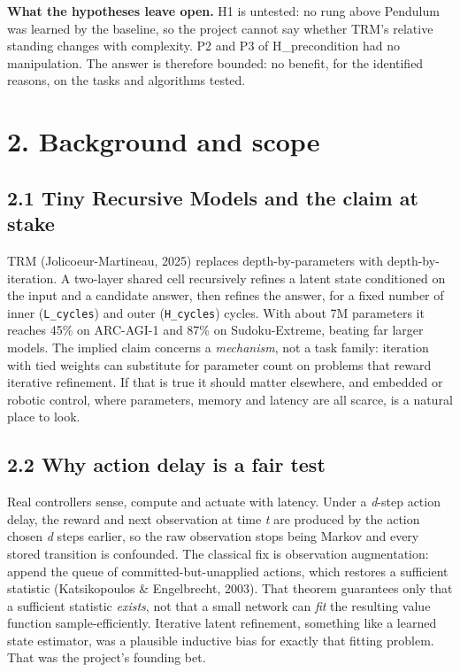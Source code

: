 \documentclass[11pt]{article}
\begin{document}
\textbf{What the hypotheses leave open.} H1 is untested: no rung above Pendulum was learned by the baseline, so the project cannot say whether TRM's relative standing changes with complexity. P2 and P3 of H\_precondition had no manipulation. The answer is therefore bounded: no benefit, for the identified reasons, on the tasks and algorithms tested.





\medskip



\section*{2. Background and scope}



\subsection*{2.1 Tiny Recursive Models and the claim at stake}



TRM (Jolicoeur-Martineau, 2025) replaces depth-by-parameters with depth-by-iteration. A two-layer shared cell recursively refines a latent state conditioned on the input and a candidate answer, then refines the answer, for a fixed number of inner (\texttt{L\_cycles}) and outer (\texttt{H\_cycles}) cycles. With about 7M parameters it reaches 45\% on ARC-AGI-1 and 87\% on Sudoku-Extreme, beating far larger models. The implied claim concerns a \emph{mechanism}, not a task family: iteration with tied weights can substitute for parameter count on problems that reward iterative refinement. If that is true it should matter elsewhere, and embedded or robotic control, where parameters, memory and latency are all scarce, is a natural place to look.



\subsection*{2.2 Why action delay is a fair test}



Real controllers sense, compute and actuate with latency. Under a \emph{d}-step action delay, the reward and next observation at time \emph{t} are produced by the action chosen \emph{d} steps earlier, so the raw observation stops being Markov and every stored transition is confounded. The classical fix is observation augmentation: append the queue of committed-but-unapplied actions, which restores a sufficient statistic (Katsikopoulos \& Engelbrecht, 2003). That theorem guarantees only that a sufficient statistic \emph{exists}, not that a small network can \emph{fit} the resulting value function sample-efficiently. Iterative latent refinement, something like a learned state estimator, was a plausible inductive bias for exactly that fitting problem. That was the project's founding bet.
\end{document}
